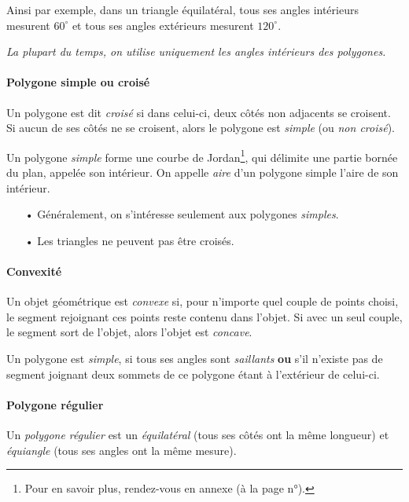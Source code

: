 \documentclass[a4paper, twoside]{article}
\begin{document}
Ainsi par exemple, dans un triangle équilatéral,
tous ses angles intérieurs mesurent $60^\circ$ et
tous ses angles extérieurs mesurent $120^\circ$.

\textit{La plupart du temps, on utilise uniquement les angles intérieurs des polygones.}

\paragraph*{Polygone simple ou croisé}

Un polygone est dit \emph{croisé} si dans celui-ci, deux côtés non adjacents se croisent.
Si aucun de ses côtés ne se croisent, alors le polygone est \emph{simple} (ou \textit{non croisé}).

Un polygone \textit{simple} forme une courbe de Jordan\footnote{
	Pour en savoir plus,
	rendez-vous en annexe (à la page n°\pageref*{courbe_Jordan}).},
qui délimite une partie bornée du plan, appelée son intérieur.
On appelle \emph{aire} d'un polygone simple l'aire de son intérieur.

\begin{itemize}
	\item[•] Généralement, on s'intéresse seulement aux polygones \textit{simples}.
	\item[•] Les triangles ne peuvent pas être croisés.
\end{itemize}

\paragraph*{Convexité}

Un objet géométrique est \emph{convexe} si,
pour n'importe quel couple de points choisi,
le segment rejoignant ces points reste contenu dans l'objet.
Si avec un seul couple, le segment sort de l'objet,
alors l'objet est \emph{concave}.

Un polygone est \textit{simple},
si tous ses angles sont \textit{saillants} \textbf{ou}
s'il n'existe pas de segment joignant deux sommets de ce polygone étant à l'extérieur de celui-ci.

\paragraph*{Polygone régulier}

Un \emph{polygone régulier} est un \emph{équilatéral}
(tous ses côtés ont la même longueur) et \emph{équiangle}
(tous ses angles ont la même mesure).
\end{document}
